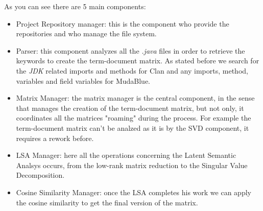 As you can see there are 5 main components:
\begin{itemize}
	\item Project Repository manager: this is the component who provide the repositories and who manage the file system.
	\item Parser: this component analyzes all the \emph{.java} files in order to retrieve the keywords to create the term-document matrix. As stated before we search for the \emph{JDK} related imports and methods for Clan and any imports, method, variables and field variables for MudaBlue.
	\item Matrix Manager: the matrix manager is the central component, in the sense that manages the creation of the term-document matrix, but not only, it coordinates all the matrices "roaming" during the process. For example the term-document matrix can't be analzed as it is by the SVD component, it requires a rework before.
	\item LSA Manager: here all the operations concerning the Latent Semantic Analsys occurs, from the low-rank matrix reduction to the Singular Value Decomposition.
	\item Cosine Similarity Manager: once the LSA completes his work we can apply the cosine similarity to get the final version of the matrix.
\end{itemize}

